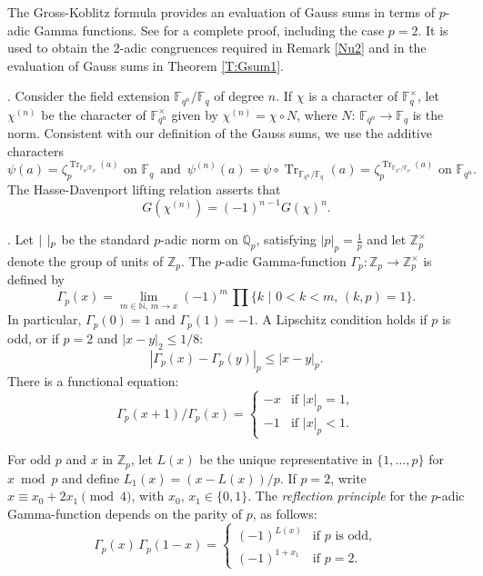 \documentclass[12pt]{amsart}  \usepackage{amsmath,amssymb,enumerate,amscd,tikz,url}
\numberwithin{equation}{section}
\theoremstyle{definition}
\newcommand{\F}{{\mathbb F}}
\newcommand{\N}{{\mathbb N}}
\newcommand{\Q}{{\mathbb Q}}
\newcommand{\Z}{{\mathbb Z}}
\newcommand{\Tr}{\operatorname{Tr}}
\newcommand{\vv}[1]{{\left\vert {#1} \right\vert}}
\begin{document}
The Gross-Koblitz formula \cite{GK} provides an evaluation of Gauss sums in terms of $p$-adic Gamma functions.  See \cite{C} for a complete proof, including the case $p = 2$.   It is used to obtain the 2-adic congruences required in Remark \ref{Nu2} and in the evaluation of Gauss sums in Theorem \ref{T:Gsum1}.

\vspace{5 pt}

.
Consider the field extension $\F_{q^n}/\F_q$ of degree $n$. If $\chi$ is a character of $\F_q^\times$, let $\chi^{(n)}$ be the character of $\F_{q^n}^\times$ given by $\chi^{(n)}=\chi \circ N$, where $N\!: \, \F_{q^n} \to \F_q$ is the norm.  Consistent with our definition of the Gauss sums, we use the additive characters 
$$
\psi(a) = \zeta_p^{\Tr_{\F_q/\F_p}(a)} \text{ on } \F_q \, \text{ and } \, \psi^{(n)}(a) = \psi\circ \Tr_{\F_{q^n}/\F_q}(a) =  \zeta_p^{\Tr_{\F_{q^n}/\F_p}(a)}  \text{ on } \F_{q^n}.
$$
The Hasse-Davenport lifting relation asserts that 
\begin{equation} \label{HD}
G(\chi^{(n)}) = (-1)^{n-1}G(\chi)^n.
\end{equation}

\vspace{5 pt}

.  
Let $\vert \hspace{4 pt} \vert_p$ be the standard $p$-adic norm on $\Q_p$, satisfying $\vert p \vert_p = \frac{1}{p}$ and let $\Z_p^{\times}$ denote the group of units of $\Z_p$.  The $p$-adic Gamma-function $\Gamma_p: \Z_p\rightarrow \Z_p^\times$ is defined by
$$
\Gamma_p(x) = \lim_{m \in \N, \, m \to x}(-1)^m \, \prod \{ k \,\, \vert \,\, 0 < k < m, \, (k,p)=1\}.
$$
In particular, $\Gamma_p(0) = 1$ and  $\Gamma_p(1) = -1$.  A Lipschitz condition \cite[p.~370]{Coh}  holds if $p$ is odd, or if $p = 2$ and $\vv{x - y}_2 \leq 1/8$:
\begin{equation} \label{Lip}
\vv{\Gamma_p(x)-\Gamma_p(y)}_p \le \vv{x-y}_p.
\end{equation}
There is a functional equation: 
\begin{equation} \label{FuncEq}
\Gamma_p(x+1)/\Gamma_p(x) = \begin{cases} -x &\text{if } \vv{x}_p = 1, \\ -1 &\text{if } \vv{x}_p < 1. \end{cases}
\end{equation}

For odd $p$ and $x$ in $\Z_p$, let $L(x)$ be the unique representative in $\{1, \dots, p\}$ for $x \bmod{p}$ and define $L_1(x) = (x-L(x))/p$.    If $p = 2$, write $x \equiv x_0 + 2x_1 \pmod{4}$, with $x_0, \, x_1 \in \{0,1\}$.  The {\em reflection principle} for the $p$-adic Gamma-function depends on the parity of $p$, as follows:
\begin{equation} \label{reflec}
\Gamma_p(x) \, \Gamma_p(1-x) = \begin{cases} (-1)^{L(x)} &\text{if } p \text{ is odd}, \\ 
(-1)^{1+x_1}   &\text{if } p = 2. \end{cases}
\end{equation}
\end{document}
